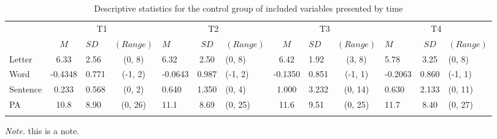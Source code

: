 \documentclass[
  english,
  ,man]{apa6}
\begin{document}
\begin{table}[tbp]

\begin{center}
\begin{threeparttable}

\caption{\label{tab:desc-read-control-table}Descriptive statistics for the control group of included variables presented by time}

\small{

\begin{tabular}{lclclclclclcl}
\toprule
 & \multicolumn{3}{c}{T1} & \multicolumn{3}{c}{T2} & \multicolumn{3}{c}{T3} & \multicolumn{3}{c}{T4} \\
\cmidrule(r){2-4} \cmidrule(r){5-7} \cmidrule(r){8-10} \cmidrule(r){11-13}
  & $M$ & $SD$ & $(Range)$ & $M$ & $SD$ & $(Range)$ & $M$ & $SD$ & $(Range)$ & $M$ & $SD$ & $(Range)$\\
\midrule
Letter & 6.33 & 2.56 & (0, 8) & 6.32 & 2.50 & (0, 8) & 6.42 & 1.92 & (3, 8) & 5.78 & 3.25 & (0, 8)\\
Word & -0.4348 & 0.771 & (-1, 2) & -0.0643 & 0.987 & (-1, 2) & -0.1350 & 0.851 & (-1, 1) & -0.2063 & 0.860 & (-1, 1)\\
Sentence & 0.233 & 0.568 & (0, 2) & 0.640 & 1.350 & (0, 4) & 1.000 & 3.232 & (0, 14) & 0.630 & 2.133 & (0, 11)\\
PA & 10.8 & 8.90 & (0, 26) & 11.1 & 8.69 & (0, 25) & 11.6 & 9.51 & (0, 25) & 11.7 & 8.40 & (0, 27)\\
\bottomrule
\addlinespace
\end{tabular}

}

\begin{tablenotes}[para]
\normalsize{\textit{Note.}  this is a note.}
\end{tablenotes}

\end{threeparttable}
\end{center}

\end{table}
\end{document}

